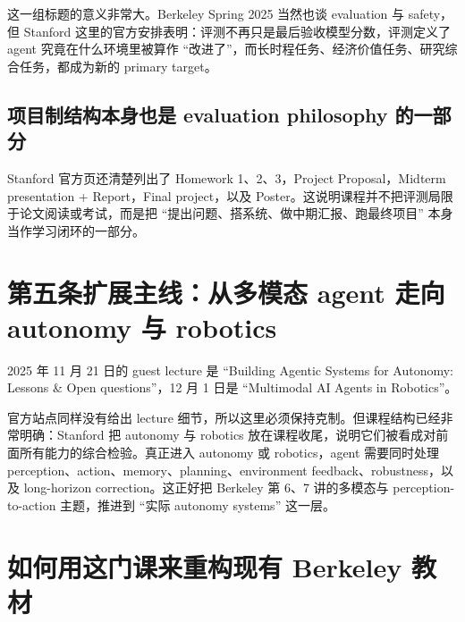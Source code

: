 \documentclass[UTF8]{ctexbook}
\begin{document}
这一组标题的意义非常大。Berkeley Spring 2025 当然也谈 evaluation 与 safety，但 Stanford 这里的官方安排表明：评测不再只是最后验收模型分数，评测定义了 agent 究竟在什么环境里被算作 ``改进了''，而长时程任务、经济价值任务、研究综合任务，都成为新的 primary target。

\subsection{项目制结构本身也是 evaluation philosophy 的一部分}

Stanford 官方页还清楚列出了 Homework 1、2、3，Project Proposal，Midterm presentation + Report，Final project，以及 Poster。这说明课程并不把评测局限于论文阅读或考试，而是把 ``提出问题、搭系统、做中期汇报、跑最终项目'' 本身当作学习闭环的一部分。

\section{第五条扩展主线：从多模态 agent 走向 autonomy 与 robotics}

2025 年 11 月 21 日的 guest lecture 是 ``Building Agentic Systems for Autonomy: Lessons \& Open questions''，12 月 1 日是 ``Multimodal AI Agents in Robotics''。

官方站点同样没有给出 lecture 细节，所以这里必须保持克制。但课程结构已经非常明确：Stanford 把 autonomy 与 robotics 放在课程收尾，说明它们被看成对前面所有能力的综合检验。真正进入 autonomy 或 robotics，agent 需要同时处理 perception、action、memory、planning、environment feedback、robustness，以及 long-horizon correction。这正好把 Berkeley 第 6、7 讲的多模态与 perception-to-action 主题，推进到 ``实际 autonomy systems'' 这一层。

\section{如何用这门课来重构现有 Berkeley 教材}
\end{document}
